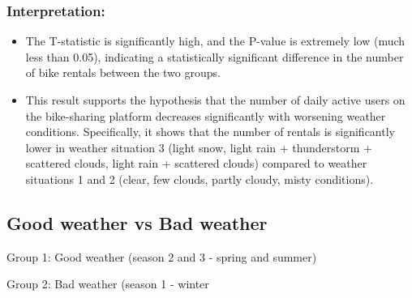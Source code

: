 \documentclass[
]{article}
\newenvironment{Shaded}{\begin{snugshade}}{\end{snugshade}}
\newcommand{\AttributeTok}[1]{\textcolor[rgb]{0.13,0.29,0.53}{#1}}
\newcommand{\CommentTok}[1]{\textcolor[rgb]{0.56,0.35,0.01}{\textit{#1}}}
\newcommand{\ConstantTok}[1]{\textcolor[rgb]{0.56,0.35,0.01}{#1}}
\newcommand{\DecValTok}[1]{\textcolor[rgb]{0.00,0.00,0.81}{#1}}
\newcommand{\FunctionTok}[1]{\textcolor[rgb]{0.13,0.29,0.53}{\textbf{#1}}}
\newcommand{\NormalTok}[1]{#1}
\newcommand{\OtherTok}[1]{\textcolor[rgb]{0.56,0.35,0.01}{#1}}
\newcommand{\SpecialCharTok}[1]{\textcolor[rgb]{0.81,0.36,0.00}{\textbf{#1}}}
\begin{document}
\subsubsection{\texorpdfstring{\textbf{Interpretation:}}{Interpretation:}}\label{interpretation-2}

\begin{itemize}
\item
  The T-statistic is significantly high, and the P-value is extremely
  low (much less than 0.05), indicating a statistically significant
  difference in the number of bike rentals between the two groups.
\item
  This result supports the hypothesis that the number of daily active
  users on the bike-sharing platform decreases significantly with
  worsening weather conditions. Specifically, it shows that the number
  of rentals is significantly lower in weather situation 3 (light snow,
  light rain + thunderstorm + scattered clouds, light rain + scattered
  clouds) compared to weather situations 1 and 2 (clear, few clouds,
  partly cloudy, misty conditions).
\end{itemize}

\subsubsection{}\label{section}

\subsection{Good weather vs Bad
weather}\label{good-weather-vs-bad-weather}

Group 1: Good weather (season 2 and 3 - spring and summer)

Group 2: Bad weather (season 1 - winter

\begin{Shaded}
\end{Shaded}
\end{document}
